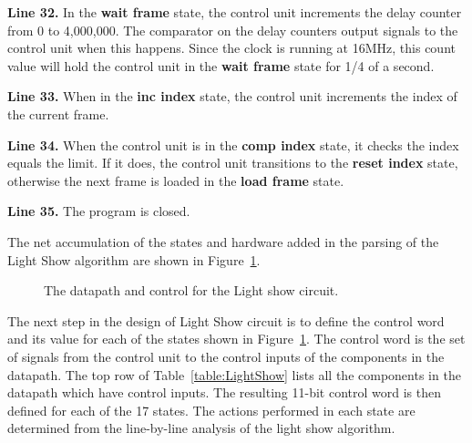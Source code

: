 {\bf Line 32.} In the {\bf wait frame} state, the control unit increments the 
delay counter from 0 to 4,000,000.  The comparator on the delay counters output 
signals to the control unit when this happens.  Since the clock is running at 
16MHz, this count value will hold the control unit in the {\bf wait frame} state
for 1/4 of a second.

{\bf Line 33.}  When in the {\bf inc index} state, the control unit increments 
the index of the current frame.

{\bf Line 34.} When the control unit is in the {\bf comp index} state, it checks 
the index equals the limit.  If it does, the control unit transitions to 
the {\bf reset index} state, otherwise the next frame is loaded in the 
{\bf load frame} state.

{\bf Line 35.}  The program is closed.

The net accumulation of the states and hardware added in the parsing of the Light Show 
algorithm are shown in Figure~\ref{fig:LightShowCir}.
 
\begin{figure}[ht]
\caption{The datapath and control for the Light show circuit.}
\label{fig:LightShowCir}
\end{figure}

The next step in the design of Light Show circuit is to define the control word and 
its value for each of the states shown in Figure~\ref{fig:LightShowCir}.  The control 
word is the set of signals from the control unit to the control inputs of the 
components in the datapath.  The top row of Table~\ref{table:LightShow} lists all 
the components in the datapath which have control inputs.  The resulting 11-bit control 
word is then defined for each of the 17 states. The actions performed in each state 
are determined from the line-by-line analysis of the light show algorithm.

